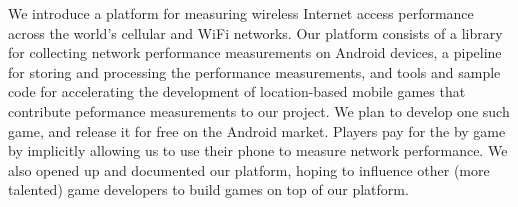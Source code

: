 \label{s:abstract}

We introduce a platform for measuring wireless Internet access performance
across the world's cellular and WiFi networks. Our platform consists of a
library for collecting network performance measurements on Android devices, a
pipeline for storing and processing the performance measurements, and tools and
sample code for accelerating the development of location-based mobile games
that contribute peformance measurements to our project. We plan to develop one
such game, and release it for free on the Android market. Players pay for the
by game by implicitly allowing us to use their phone to measure network
performance. We also opened up and documented our platform, hoping to influence
other (more talented) game developers to build games on top of our platform.

